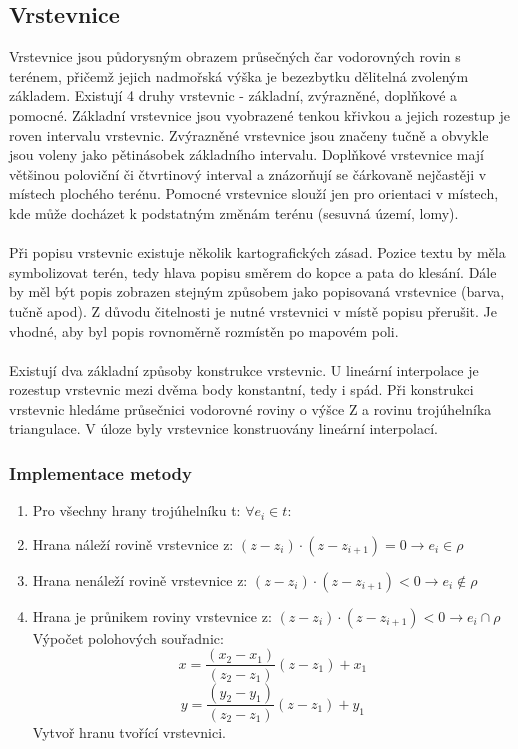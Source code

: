 \documentclass[a4paper, 12pt]{article}
\begin{document}
\subsection{Vrstevnice}
Vrstevnice jsou půdorysným obrazem průsečných čar vodorovných rovin s terénem, přičemž jejich nadmořská výška je bezezbytku dělitelná zvoleným základem. Existují 4 druhy vrstevnic - základní, zvýrazněné, doplňkové a pomocné. Základní vrstevnice jsou vyobrazené tenkou křivkou a jejich rozestup je roven intervalu vrstevnic. Zvýrazněné vrstevnice jsou značeny tučně a obvykle jsou voleny jako pětinásobek základního intervalu. Doplňkové vrstevnice mají většinou poloviční či čtvrtinový interval a znázorňují se čárkovaně nejčastěji v místech  plochého terénu. Pomocné vrstevnice slouží jen pro orientaci v místech, kde může docházet k podstatným změnám terénu (sesuvná území, lomy). \\
\\
Při popisu vrstevnic existuje několik kartografických zásad. Pozice textu by měla symbolizovat terén, tedy hlava popisu směrem do kopce a pata do klesání. Dále by měl být popis zobrazen stejným způsobem jako popisovaná vrstevnice (barva, tučně apod). Z důvodu čitelnosti je nutné vrstevnici v místě popisu přerušit. Je vhodné, aby byl popis rovnoměrně rozmístěn po mapovém poli. \\
\\
Existují dva základní způsoby konstrukce vrstevnic. U lineární interpolace je rozestup vrstevnic mezi dvěma body konstantní, tedy i spád. Při konstrukci vrstevnic hledáme průsečnici vodorovné roviny o výšce Z a rovinu trojúhelníka triangulace. V úloze byly vrstevnice konstruovány lineární interpolací.\\

\subsubsection{Implementace metody}
\begin{enumerate}
\item Pro všechny hrany trojúhelníku t: $ \forall e_i \in t: $
\item Hrana náleží rovině vrstevnice z: $ (z - z_i) \cdot (z - z_{i+1}) = 0 \rightarrow e_i \in \rho $
\item Hrana nenáleží rovině vrstevnice z: $ (z - z_i) \cdot (z - z_{i+1}) < 0 \rightarrow e_i \not \in \rho $
\item Hrana je průnikem roviny vrstevnice z: $ (z - z_i) \cdot (z - z_{i+1}) < 0 \rightarrow e_i \cap \rho $
\subitem Výpočet polohových souřadnic: 
$$  x = \frac{(x_2 - x_1)}{(z_2 - z_1)} (z - z_1) + x_1 $$ 
$$  y = \frac{(y_2 - y_1)}{(z_2 - z_1)} (z - z_1) + y_1 $$ 
\subitem Vytvoř hranu tvořící vrstevnici.

\end{enumerate}
\end{document}
